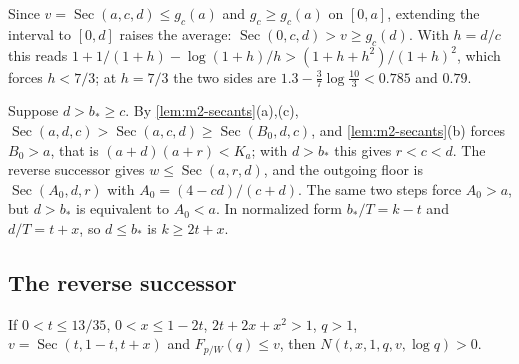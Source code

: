  Since $v=\operatorname{Sec}(a,c,d)\le g_c(a)$ and $g_c\ge g_c(a)$ on
$[0,a]$, extending the interval to $[0,d]$ raises the average:
$\operatorname{Sec}(0,c,d)>v\ge g_c(d)$. With $h=d/c$ this reads
$1+1/(1+h)-\log(1+h)/h>(1+h+h^2)/(1+h)^2$, which forces $h<7/3$; at $h=7/3$ the two sides are
$1.3-\frac37\log\frac{10}3<0.785$ and $0.79$.

 Suppose $d>b_*\ge c$. By \cref{lem:m2-secants}(a),(c),
$\operatorname{Sec}(a,d,c)>\operatorname{Sec}(a,c,d)\ge\operatorname{Sec}(B_0,d,c)$, and
\cref{lem:m2-secants}(b) forces $B_0>a$, that is $(a+d)(a+r)<K_a$; with $d>b_*$ this gives $r<c<d$.
The reverse successor gives $w\le\operatorname{Sec}(a,r,d)$, and the outgoing floor is
$\operatorname{Sec}(A_0,d,r)$ with $A_0=(4-cd)/(c+d)$. The same two steps force $A_0>a$, but
$d>b_*$ is equivalent to $A_0<a$. In normalized form $b_*/T=k-t$ and $d/T=t+x$, so $d\le b_*$ is
$k\ge2t+x$.

\subsection{The reverse successor}\label{app:m2-reverse-signs}

\begin{lemma}\label{lem:m2-unit-shape}
If $0<t\le13/35$, $0<x\le1-2t$, $2t+2x+x^2>1$, $q>1$, $v=\operatorname{Sec}(t,1-t,t+x)$ and
$F_{p/W}(q)\le v$, then $N(t,x,1,q,v,\log q)>0$.
\end{lemma}

